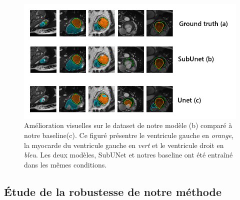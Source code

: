 \documentclass[french, english]{article}
\begin{document}
\begin{figure}[h]
    \centering
    \includegraphics[scale=1.75]{img/comparaison.png}
    \caption{Amélioration visuelles sur le dataset de notre modèle (b) comparé à notre baseline(c). Ce figuré présentre le ventricule gauche en \textit{orange}, la myocarde du ventricule gauche en \textit{vert} et le ventricule droit en \textit{bleu}. Les deux modèles, SubUNet et notres baseline ont été entraîné dans les mêmes conditions.}
    \label{fig:baseline}
\end{figure}




\subsection{Étude de la robustesse de notre méthode}
\label{robustesse}
\end{document}
